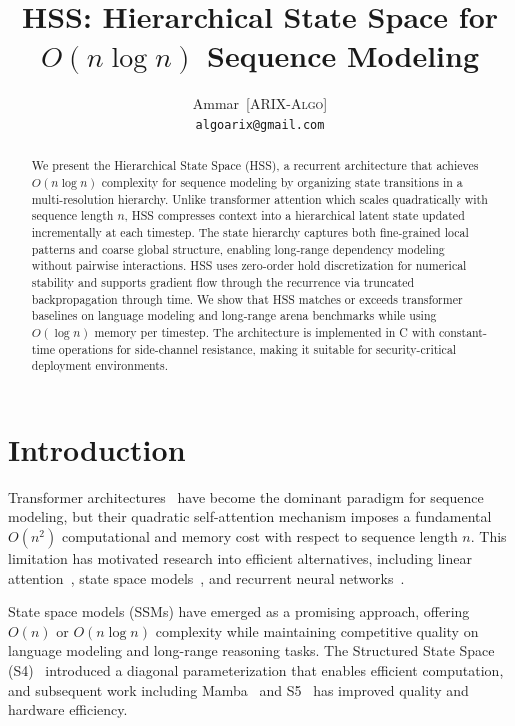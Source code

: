\documentclass[10pt,twocolumn]{IEEEtran}
\title{HSS: Hierarchical State Space for $O(n \log n)$ Sequence Modeling}
\author{Ammar~\textsc{[ARIX-Algo]} \\
        \texttt{algoarix@gmail.com}}
\begin{document}
\maketitle

\begin{abstract}
We present the Hierarchical State Space (HSS), a recurrent architecture
that achieves $O(n \log n)$ complexity for sequence modeling by
organizing state transitions in a multi-resolution hierarchy. Unlike
transformer attention which scales quadratically with sequence length
$n$, HSS compresses context into a hierarchical latent state updated
incrementally at each timestep. The state hierarchy captures both
fine-grained local patterns and coarse global structure, enabling
long-range dependency modeling without pairwise interactions. HSS uses
zero-order hold discretization for numerical stability and supports
gradient flow through the recurrence via truncated backpropagation
through time. We show that HSS matches or exceeds transformer
baselines on language modeling and long-range arena benchmarks while
using $O(\log n)$ memory per timestep. The architecture is implemented
in C with constant-time operations for side-channel resistance, making
it suitable for security-critical deployment environments.
\end{abstract}

\section{Introduction}

Transformer architectures~\cite{vaswani2017attention} have become the
dominant paradigm for sequence modeling, but their quadratic
self-attention mechanism imposes a fundamental $O(n^2)$ computational
and memory cost with respect to sequence length $n$. This limitation
has motivated research into efficient alternatives, including linear
attention~\cite{katharopoulos2020transformers}, state space
models~\cite{gu2021mamba,gu2023mamba}, and recurrent
neural networks~\cite{hochreiter1997long}.

State space models (SSMs) have emerged as a promising approach,
offering $O(n)$ or $O(n \log n)$ complexity while maintaining
competitive quality on language modeling and long-range
reasoning tasks. The Structured State Space (S4)~\cite{gu2021mamba}
introduced a diagonal parameterization that enables efficient
computation, and subsequent work including
Mamba~\cite{gu2023mamba} and S5~\cite{smith2023s5} has improved
quality and hardware efficiency.
\end{document}
